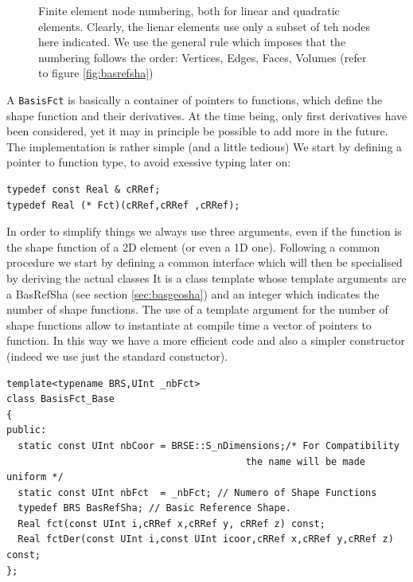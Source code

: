 \begin{figure}[bp]
\begin{center}
\end{center}
\caption{Finite element node numbering, both for linear and quadratic
  elements. Clearly, the lienar elements use only a subset of teh nodes
  here indicated. We use the general rule which imposes that the
  numbering follows the order: Vertices, Edges, Faces,
  Volumes (refer to figure \ref{fig:basrefsha})}\label{fig:fem}
\end{figure}

A \texttt{BasisFct} is basically a container of pointers to functions,
which define the shape function and their derivatives. At the time
being, only first derivatives have been considered, yet it may in
principle be possible to add more in the future.  The implementation
is rather simple (and a little tedious)
We start by defining a pointer to function type, to avoid exessive
typing later on:

\begin{verbatim}
typedef const Real & cRRef;
typedef Real (* Fct)(cRRef,cRRef ,cRRef);
\end{verbatim}
In order to simplify things we always use three arguments, even if
the function is the shape function of a 2D element (or even a 1D one).
Following a common procedure we start by defining a common interface
which will then be specialised by deriving the actual classes
It is a class template whose template arguments are a BasRefSha (see
section \ref{sec:basgeosha}) and an integer which indicates the number
of shape functions. The use of a template argument for 
the number of shape functions allow to instantiate at compile time a 
vector of pointers to function. In this way we have a more efficient code
and also a simpler constructor (indeed we use just the standard constuctor).

\begin{verbatim}
template<typename BRS,UInt _nbFct>
class BasisFct_Base
{
public:
  static const UInt nbCoor = BRSE::S_nDimensions;/* For Compatibility
                                          the name will be made uniform */
  static const UInt nbFct  = _nbFct; // Numero of Shape Functions
  typedef BRS BasRefSha; // Basic Reference Shape.
  Real fct(const UInt i,cRRef x,cRRef y, cRRef z) const;
  Real fctDer(const UInt i,const UInt icoor,cRRef x,cRRef y,cRRef z) const;
};
\end{verbatim}

